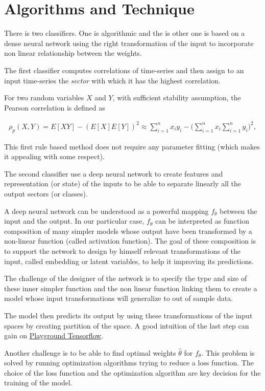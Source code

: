 \documentclass[a4paper,twoside]{article}
\begin{document}
\section{Algorithms and Technique}
\label{sec:org90358cc}

There is two classifiers. One is algorithmic and the is other one is based on
a dense neural network using the right transformation of the input to
incorporate non linear relationship between the weights.

The first classifier computes correlations of time-series and then assign to an
input time-series the \emph{sector} with which it has the highest correlation. 

For two random variables \(X\) and \(Y\), with sufficient stability assumption, the
Pearson correlation is defined as

\begin{align*}
  \rho_p(X, Y) = E[XY] - (E[X]E[Y])^2 \approx \sum_{i=1}^n x_iy_i - \Big(\sum_{i=1}^nx_i\sum_{i=1}^n y_i\Big)^2,
\end{align*}

This first rule based method does not require any parameter fitting (which
makes it appealing with some respect). 

The second classifier use a deep neural network to create features and
representation (or state) of the inputs to be able to separate linearly all
the output sectors (or classes). 

A deep neural network can be understood as a powerful mapping \(f_\theta\)
between the input and the output. In our particular case, \(f_\theta\) can be
interpreted as function composition of many simpler models whose output have
been transformed by a non-linear function (called activation function). The
goal of these composition is to support the network to design by himself
relevant transformations of the input, called embedding or latent variables,
to help it improving its predictions.

The challenge of the designer of the network is to specify the type and size
of these inner simpler function and the non linear function linking them to
create a model whose input transformations will generalize to out of sample
data.

The model then predicts its output by using these transformations of the input
spaces by creating partition of the space. A good intuition of the last step
can gain on \href{https://playground.tensorflow.org}{Playground Tensorflow}.

Another challenge is to be able to find optimal weights \(\hat\theta\) for
\(f_\theta\). This problem is solved by running optimization algorithms trying
to reduce a loss function. The choice of the loss function and the
optimization algorithm are key decision for the training of the model.
\end{document}
